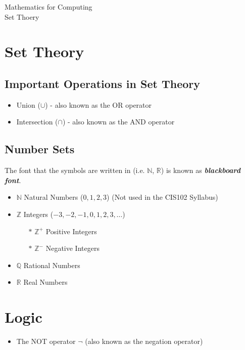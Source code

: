 \documentclass[12pt]{article}
\begin{document}
\begin{center}
\huge{Mathematics for Computing}\\
\LARGE{Set Thoery}
\end{center}


\section{Set Theory}
\subsection{Important Operations in Set Theory}
\begin{itemize}
\item Union ($\cup$) - also known as the OR operator
\item Intersection ($\cap$) - also known as the AND operator
\end{itemize}
\subsection{Number Sets}
The font that the symbols are written in (i.e. $\mathbb{N}$, $\mathbb{R}$) is known as \textit{\textbf{blackboard font}}.
\begin{itemize}
\item $\mathbb{N}$ Natural Numbers ($0,1,2,3$) 
(Not used in the CIS102 Syllabus)
\item $\mathbb{Z}$ Integers ($-3,-2,-1,0,1,2,3, \ldots$)
\begin{itemize}
\item[$\ast$] $\mathbb{Z}^{+}$ Positive Integers
\item[$\ast$] $\mathbb{Z}^{-}$ Negative Integers
\end{itemize}
\item $\mathbb{Q}$ Rational Numbers
\item $\mathbb{R}$ Real Numbers
\end{itemize}

\newpage
\section{Logic}
\begin{itemize}
\item The NOT operator $\neg$ (also known as the negation operator)
\end{itemize}
\end{document}
